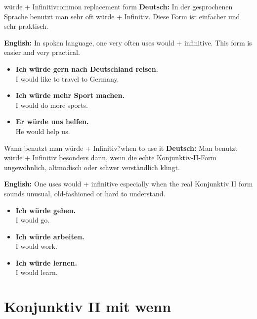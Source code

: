 \documentclass[a4paper,11pt]{article}
\newcommand{\GermanText}[1]{\textbf{Deutsch: }#1\par}
\newcommand{\EnglishText}[1]{{\small\color{SoftGray}\textbf{English: }#1\par}}
\newcommand{\ExampleItem}[2]{\item \textbf{#1}\\{\small\color{SoftGray}#2}}
\begin{document}
    \begin{grammarentry}{würde + Infinitiv}{common replacement form}
        \GermanText{In der gesprochenen Sprache benutzt man sehr oft würde + Infinitiv. Diese Form ist einfacher und sehr praktisch.}
        \EnglishText{In spoken language, one very often uses would + infinitive. This form is easier and very practical.}
        
        \begin{exbox}
            \begin{itemize}
                \ExampleItem{Ich würde gern nach Deutschland reisen.}{I would like to travel to Germany.}
                \ExampleItem{Ich würde mehr Sport machen.}{I would do more sports.}
                \ExampleItem{Er würde uns helfen.}{He would help us.}
            \end{itemize}
        \end{exbox}
    \end{grammarentry}
    
    \begin{grammarentry}{Wann benutzt man würde + Infinitiv?}{when to use it}
        \GermanText{Man benutzt würde + Infinitiv besonders dann, wenn die echte Konjunktiv-II-Form ungewöhnlich, altmodisch oder schwer verständlich klingt.}
        \EnglishText{One uses would + infinitive especially when the real Konjunktiv II form sounds unusual, old-fashioned or hard to understand.}
        
        \begin{exbox}
            \begin{itemize}
                \ExampleItem{Ich würde gehen.}{I would go.}
                \ExampleItem{Ich würde arbeiten.}{I would work.}
                \ExampleItem{Ich würde lernen.}{I would learn.}
            \end{itemize}
        \end{exbox}
    \end{grammarentry}
    
    \section{Konjunktiv II mit wenn}
    
\end{document}
